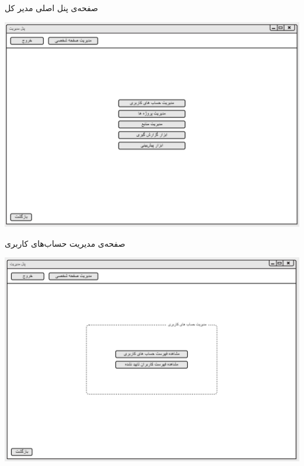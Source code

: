 \documentclass{article}
\begin{document}
\vspace{1cm}
صفحه‌ی پنل اصلی مدیر کل
\begin{center}
\includegraphics[width=\textwidth]{Prototype/HeadManager/HeadManagerMainPanel.png}
\end{center}

\newpage
\vspace{1cm}
صفحه‌ی مدیریت حساب‌های کاربری 
\begin{center}
\includegraphics[width=\textwidth]{Prototype/HeadManager/AccountManager.png}
\end{center}
\end{document}
